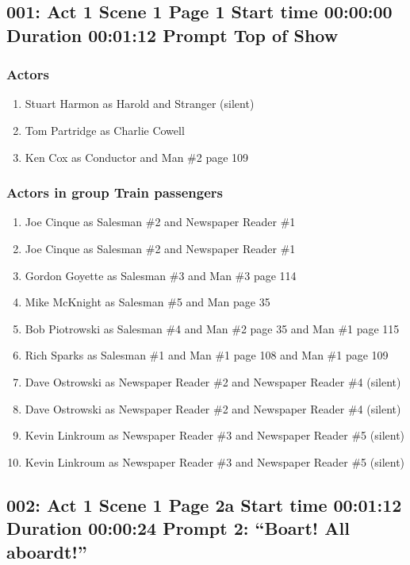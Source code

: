 \subsection{001: Act 1 Scene 1 Page 1 Start time 00:00:00 Duration 00:01:12 Prompt Top of Show}

\subsubsection{Actors}
\begin{enumerate}
\item Stuart Harmon as Harold and Stranger (silent)
\item Tom Partridge as Charlie Cowell
\item Ken Cox as Conductor and Man \#2 page 109
\end{enumerate}
\subsubsection{Actors in group Train passengers}
\begin{enumerate}
\item Joe Cinque as Salesman \#2 and Newspaper Reader \#1
\item Joe Cinque as Salesman \#2 and Newspaper Reader \#1
\item Gordon Goyette as Salesman \#3 and Man \#3 page 114
\item Mike McKnight as Salesman \#5 and Man page 35
\item Bob Piotrowski as Salesman \#4 and Man \#2 page 35 and Man \#1 page 115
\item Rich Sparks as Salesman \#1 and Man \#1 page 108 and Man \#1 page 109
\item Dave Ostrowski as Newspaper Reader \#2 and Newspaper Reader \#4 (silent)
\item Dave Ostrowski as Newspaper Reader \#2 and Newspaper Reader \#4 (silent)
\item Kevin Linkroum as Newspaper Reader \#3 and Newspaper Reader \#5 (silent)
\item Kevin Linkroum as Newspaper Reader \#3 and Newspaper Reader \#5 (silent)
\end{enumerate}


\subsection{002: Act 1 Scene 1 Page 2a Start time 00:01:12 Duration 00:00:24 Prompt 2: ``Boart!  All aboardt!''}

